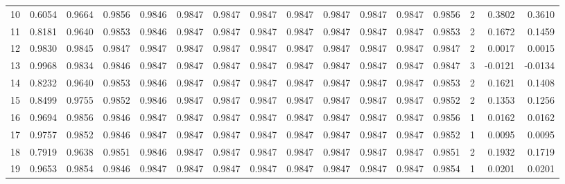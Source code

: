 \begin{tabular}{lrrrrrrrrrrrrrrr}
10 &      0.6054 &  0.9664 &  0.9856 &  0.9846 &  0.9847 &  0.9847 &  0.9847 &  0.9847 &  0.9847 &  0.9847 &   0.9847 &     0.9856 &      2 &                    0.3802 &                     0.3610 \\
11 &      0.8181 &  0.9640 &  0.9853 &  0.9846 &  0.9847 &  0.9847 &  0.9847 &  0.9847 &  0.9847 &  0.9847 &   0.9847 &     0.9853 &      2 &                    0.1672 &                     0.1459 \\
12 &      0.9830 &  0.9845 &  0.9847 &  0.9847 &  0.9847 &  0.9847 &  0.9847 &  0.9847 &  0.9847 &  0.9847 &   0.9847 &     0.9847 &      2 &                    0.0017 &                     0.0015 \\
13 &      0.9968 &  0.9834 &  0.9846 &  0.9847 &  0.9847 &  0.9847 &  0.9847 &  0.9847 &  0.9847 &  0.9847 &   0.9847 &     0.9847 &      3 &                   -0.0121 &                    -0.0134 \\
14 &      0.8232 &  0.9640 &  0.9853 &  0.9846 &  0.9847 &  0.9847 &  0.9847 &  0.9847 &  0.9847 &  0.9847 &   0.9847 &     0.9853 &      2 &                    0.1621 &                     0.1408 \\
15 &      0.8499 &  0.9755 &  0.9852 &  0.9846 &  0.9847 &  0.9847 &  0.9847 &  0.9847 &  0.9847 &  0.9847 &   0.9847 &     0.9852 &      2 &                    0.1353 &                     0.1256 \\
16 &      0.9694 &  0.9856 &  0.9846 &  0.9847 &  0.9847 &  0.9847 &  0.9847 &  0.9847 &  0.9847 &  0.9847 &   0.9847 &     0.9856 &      1 &                    0.0162 &                     0.0162 \\
17 &      0.9757 &  0.9852 &  0.9846 &  0.9847 &  0.9847 &  0.9847 &  0.9847 &  0.9847 &  0.9847 &  0.9847 &   0.9847 &     0.9852 &      1 &                    0.0095 &                     0.0095 \\
18 &      0.7919 &  0.9638 &  0.9851 &  0.9846 &  0.9847 &  0.9847 &  0.9847 &  0.9847 &  0.9847 &  0.9847 &   0.9847 &     0.9851 &      2 &                    0.1932 &                     0.1719 \\
19 &      0.9653 &  0.9854 &  0.9846 &  0.9847 &  0.9847 &  0.9847 &  0.9847 &  0.9847 &  0.9847 &  0.9847 &   0.9847 &     0.9854 &      1 &                    0.0201 &                     0.0201 \\
\bottomrule
\end{tabular}
